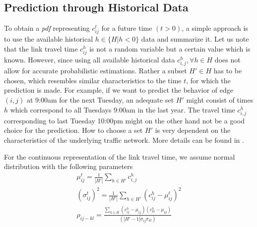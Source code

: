 

\subsection{Prediction through Historical Data}
\label{subsec:historical}
To obtain a \textit{pdf} representing $c_{ij}^t$ for a future time $(t>0)$, a
simple approach is to use the available historical $h \in \{H| h < 0\}$ data and
summarize it.
Let us note that the link travel time $c_{ij}^h$ is not a random
variable but a certain value which is known. However, since using all available
historical data $c_{i,j}^h, \forall h \in H$ does not allow for
accurate probabilistic estimations. Rather a subset $H' \in H$ has to be chosen,
which resembles similar characteristics to the time $t$, for which the
prediction is made. For example, if we want to predict the behavior of edge
$(i,j)$ at 9:00am for the next Tuesday, an adequate set $H'$ might consist of
times $h$ which correspond to all Tuesdays 9:00am in the last year. The travel
time $c_{i,j}^h$ corresponding to last Tuesday 10:00pm might on the other hand
not be a good choice for the prediction. How to choose a set $H'$ is very
dependent on the characteristics of the underlying traffic network.
More details can be found in \cite{PanDS12}.

For the continuous representation of the link travel time, we assume normal
distribution with the following parameters
\begin{gather}
	\mu_{ij}^t = \frac{1}{|H'|}\sum_{h\in H'} c_{i,j}^h\\ 
	(\sigma_{ij}^t)^2 = \frac{1}{|H'|}\sum_{h\in H'} (c_{ij}^h-\mu_{ij}^t)^2\\
	\rho_{ij-kl} = \frac{\sum_{h\in H} (c_{ij}^h - \mu_{ij}) (c_{kl}^h -
	\mu_{kl})}{(|H'-1| \sigma_{ij} \sigma_{kl})}
\end{gather}

